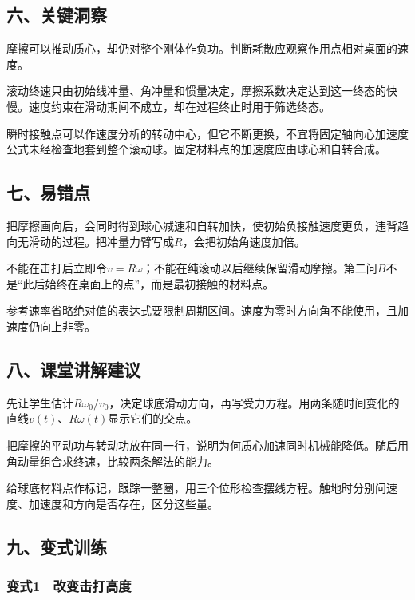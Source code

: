 \documentclass[12pt,a4paper,fontset=fandol]{ctexart}
\begin{document}
\subsection{六、关键洞察}\label{ux516dux5173ux952eux6d1eux5bdf-1}

摩擦可以推动质心，却仍对整个刚体作负功。判断耗散应观察作用点相对桌面的速度。

滚动终速只由初始线冲量、角冲量和惯量决定，摩擦系数决定达到这一终态的快慢。速度约束在滑动期间不成立，却在过程终止时用于筛选终态。

瞬时接触点可以作速度分析的转动中心，但它不断更换，不宜将固定轴向心加速度公式未经检查地套到整个滚动球。固定材料点的加速度应由球心和自转合成。

\subsection{七、易错点}\label{ux4e03ux6613ux9519ux70b9-1}

把摩擦画向后，会同时得到球心减速和自转加快，使初始负接触速度更负，违背趋向无滑动的过程。把冲量力臂写成\(R\)，会把初始角速度加倍。

不能在击打后立即令\(v=R\omega\)；不能在纯滚动以后继续保留滑动摩擦。第二问\(B\)不是``此后始终在桌面上的点''，而是最初接触的材料点。

参考速率省略绝对值的表达式要限制周期区间。速度为零时方向角不能使用，且加速度仍向上非零。

\subsection{八、课堂讲解建议}\label{ux516bux8bfeux5802ux8bb2ux89e3ux5efaux8bae-1}

先让学生估计\(R\omega_0/v_0\)，决定球底滑动方向，再写受力方程。用两条随时间变化的直线\(v(t)\)、\(R\omega(t)\)显示它们的交点。

把摩擦的平动功与转动功放在同一行，说明为何质心加速同时机械能降低。随后用角动量组合求终速，比较两条解法的能力。

给球底材料点作标记，跟踪一整圈，用三个位形检查摆线方程。触地时分别问速度、加速度和方向是否存在，区分这些量。

\subsection{九、变式训练}\label{ux4e5dux53d8ux5f0fux8badux7ec3-1}

\subsubsection{变式1　改变击打高度}\label{ux53d8ux5f0f1-ux6539ux53d8ux51fbux6253ux9ad8ux5ea6}
\end{document}
